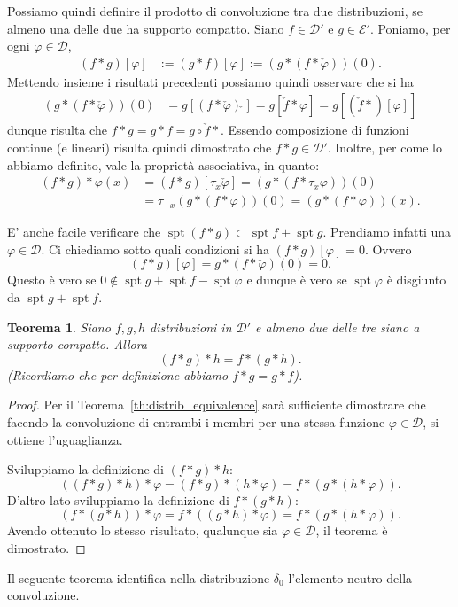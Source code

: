 \documentclass[italian,a4paper,oneside,headinclude]{scrbook}
\renewcommand{\phi}{\varphi}
\newcommand{\D}{\mathcal D}
\newcommand{\E}{\mathcal E}
\newcommand{\defeq}{:=}
\DeclareMathOperator{\spt}{spt}
\newtheorem{theorem}{Teorema}
\begin{document}
Possiamo quindi definire il prodotto di convoluzione tra due
distribuzioni, se almeno una delle due ha supporto compatto.
Siano
$f\in \D'$ e $g\in \E'$.
Poniamo, per ogni $\phi\in\D$,
\begin{align*}
  (f*g)[\phi] &\defeq (g*f)[\phi]
  \defeq (g * (f*\check \phi))(0).
\end{align*}
Mettendo insieme i risultati precedenti possiamo quindi
osservare che si ha
\begin{align*}
  (g * (f*\check \phi))(0)
  &= g[(f*\check\phi)\check\,]
  = g[\check f * \phi]
  = g[(\check f *)[\phi]]
\end{align*}
dunque risulta che $f*g = g*f = g\circ \check f*$. Essendo composizione di
funzioni continue (e lineari) risulta quindi dimostrato che $f*g\in \D'$.
Inoltre, per come lo abbiamo definito, vale la proprietà associativa,
in quanto:
\begin{align*}
(f*g)*\phi(x)
&= (f*g)[\tau_x\check \phi]
= (g * (f*\tau_x \phi))(0)\\
&= \tau_{-x}(g * (f * \phi))(0)
= (g * (f * \phi))(x).
\end{align*}

E' anche facile verificare che $\spt(f*g)\subset \spt f + \spt g$.
Prendiamo infatti una $\phi\in \D$. Ci chiediamo sotto quali
condizioni si ha $(f*g)[\phi]=0$. Ovvero
\[
(f*g)[\phi] = g * (f * \check \phi)(0) = 0.
\]
Questo è vero se $0\not \in \spt g + \spt f - \spt \phi$ e dunque è
vero se $\spt \phi$ è disgiunto da $\spt g + \spt f$.

\begin{theorem}
  Siano $f,g,h$ distribuzioni in $\D'$ e almeno due delle tre siano a
  supporto compatto. Allora
  \[
    (f*g)*h = f * (g* h).
  \]
  (Ricordiamo che per definizione abbiamo $f*g = g*f$).
\end{theorem}
%
\begin{proof}
  Per il Teorema~\ref{th:distrib_equivalence} sarà sufficiente
  dimostrare che facendo la convoluzione di entrambi i membri per una
  stessa funzione $\phi\in\D$, si ottiene l'uguaglianza.

  Sviluppiamo la definizione di $(f*g)*h$:
  \[
  ((f*g)*h)*\phi = (f*g)*(h*\phi) = f*(g*(h*\phi)).
  \]
  D'altro lato sviluppiamo la definizione di $f*(g*h)$:
  \[
  (f*(g*h))*\phi = f * ((g*h)*\phi) = f*(g*(h*\phi)).
  \]
  Avendo ottenuto lo stesso risultato, qualunque sia $\phi\in \D$, il
  teorema è dimostrato.
\end{proof}

Il seguente teorema identifica nella distribuzione $\delta_0$
l'elemento neutro della
convoluzione.
\end{document}
